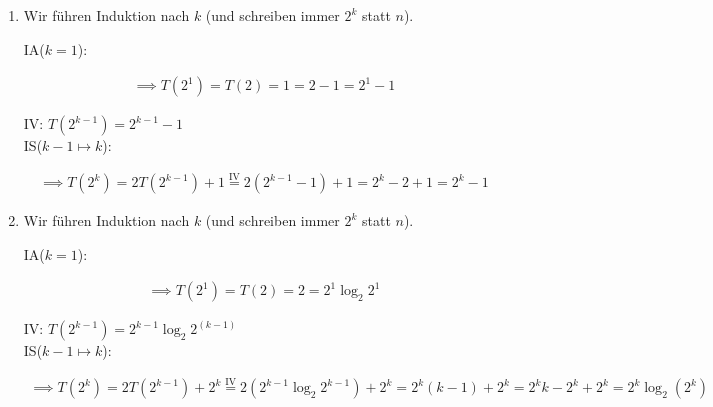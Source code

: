 \begin{solution}

\phantom{}

\begin{enumerate}[label = (\alph*)]

  \item Wir führen Induktion nach $k$ (und schreiben immer $2^k$ statt $n$).

  IA($k=1$):

  \begin{align*}
    \implies
    T(2^1)
    =
    T(2)
    =
    1
    =
    2 - 1
    =
    2^1 - 1
  \end{align*}

  IV: $T(2^{k-1}) = 2^{k-1} - 1$ \\
  IS($k-1 \mapsto k$):

  \begin{align*}
    \implies
    T(2^k)
    =
    2 T(2^{k-1}) + 1
    \stackrel{\text{IV}}{=}
    2 (2^{k-1} - 1) + 1
    =
    2^k - 2 + 1
    =
    2^k - 1
  \end{align*}

  \item Wir führen Induktion nach $k$ (und schreiben immer $2^k$ statt $n$).

  IA($k=1$):

  \begin{align*}
    \implies
    T(2^1)
    =
    T(2)
    =
    2
    =
    2^1 \log_2{2^1}
  \end{align*}

  IV: $T(2^{k-1}) = 2^{k-1} \log_2{2^{(k-1)}}$ \\
  IS($k-1 \mapsto k$):

  \begin{align*}
    \implies
    T(2^k)
    =
    2 T(2^{k-1}) + 2^k
    \stackrel{\text{IV}}{=}
    2 (2^{k-1} \log_2{2^{k-1}}) + 2^k
    =
    2^k(k-1) + 2^k
    =
    2^k k - 2^k + 2^k
    =
    2^k \log_2{(2^k)}
  \end{align*}

\end{enumerate}

\end{solution}

